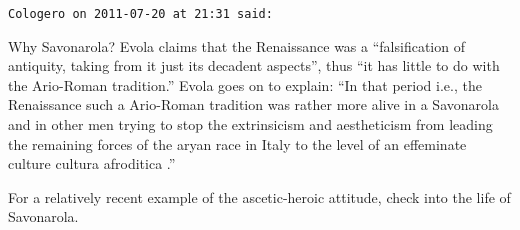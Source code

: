 \begin{footnotesize}
\begin{sffamily}
\texttt{Cologero on 2011-07-20 at 21:31 said:}

Why Savonarola? Evola claims that the Renaissance was a ``falsification of antiquity, taking from it just its decadent aspects'', thus ``it has little to do with the Ario-Roman tradition.'' Evola goes on to explain: ``In that period i.e., the Renaissance such a Ario-Roman tradition was rather more alive in a Savonarola and in other men trying to stop the extrinsicism and aestheticism from leading the remaining forces of the aryan race in Italy to the level of an effeminate culture cultura afroditica .''

For a relatively recent example of the ascetic-heroic attitude, check into the life of Savonarola.

\hfill

\end{sffamily}
\end{footnotesize}

